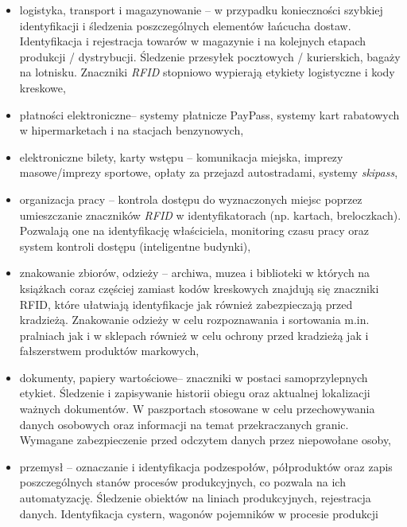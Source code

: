 \begin{itemize}\setlength{\itemsep}{0pt}
	\item logistyka, transport i magazynowanie – w przypadku konieczności szybkiej identyfikacji i śledzenia poszczególnych elementów łańcucha dostaw. Identyfikacja i rejestracja towarów w magazynie i na kolejnych etapach produkcji / dystrybucji.  Śledzenie przesyłek pocztowych / kurierskich, bagaży na lotnisku.  Znaczniki \emph{RFID} stopniowo wypierają etykiety logistyczne i kody kreskowe,

	\item płatności elektroniczne– systemy płatnicze PayPass, systemy kart rabatowych w hipermarketach i na stacjach benzynowych, 

	\item elektroniczne bilety, karty wstępu – komunikacja miejska, imprezy masowe/imprezy sportowe, opłaty za przejazd autostradami, systemy \emph{skipass},

	\item organizacja pracy – kontrola dostępu do wyznaczonych miejsc poprzez umieszczanie znaczników \emph{RFID} w identyfikatorach (np. kartach, breloczkach). Pozwalają one na identyfikację właściciela, monitoring czasu pracy oraz system kontroli dostępu (inteligentne budynki),

	\item znakowanie zbiorów, odzieży – archiwa, muzea i biblioteki w których na książkach coraz częściej zamiast kodów kreskowych znajdują się znaczniki RFID, które ułatwiają identyfikacje jak również zabezpieczają przed kradzieżą. Znakowanie odzieży w celu rozpoznawania i sortowania m.in. pralniach jak i w sklepach również w celu ochrony przed kradzieżą jak i fałszerstwem produktów markowych,
 	
 	\item dokumenty, papiery wartościowe– znaczniki w postaci samoprzylepnych etykiet. Śledzenie i zapisywanie historii obiegu oraz aktualnej lokalizacji ważnych dokumentów.  W paszportach stosowane w celu przechowywania danych osobowych oraz informacji na temat przekraczanych granic. Wymagane zabezpieczenie przed odczytem danych przez niepowołane osoby,
	
	\item przemysł – oznaczanie i  identyfikacja podzespołów, półproduktów oraz zapis poszczególnych stanów procesów produkcyjnych, co pozwala na ich automatyzację. Śledzenie obiektów na liniach produkcyjnych, rejestracja danych. Identyfikacja cystern, wagonów pojemników w procesie produkcji
	

\end{itemize}
